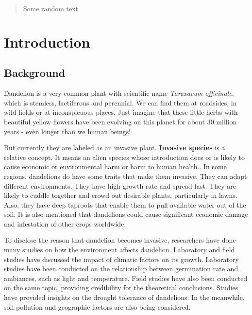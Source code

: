 \documentclass[12pt]{article}
\title{}  %
\begin{document}
\begin{abstract}

	Some random text
	
\end{abstract}

\maketitle
\tableofcontents

\section{Introduction}

	\subsection{Background}
	
	Dandelion is a very common plant with scientific name \textit{Taraxacum officinale}, which is stemless, lactiferous and perennial\autocite{stewart2002biology}.  We can find them at roadsides, in wild fields or at inconspicuous places.  Just imagine that these little herbs with beautiful yellow flowers have been evolving on this planet for about 30 million years\autocite{dandelionhistory} - even longer than we human beings!
	
	But currently they are labeled as an invasive plant.  \textbf{Invasive species} is a relative concept.  It means an alien species whose introduction does or is likely to cause economic or environmental harm or harm to human health.\autocite{defInvasive}.  In some regions, dandelions do have some traits that make them invasive.  They can adapt different environments.  They have high growth rate and spread fast. They are likely to cuddle together and crowd out desirable plants, particularly in lawns.  Also, they have deep taproots that enable them to pull available water out of the soil.  It is also mentioned that dandelions could cause significant economic damage and infestation of other crops worldwide\autocite{stewart2002biology}.
	
	To disclose the reason that dandelion becomes invasive, researchers have done many studies on how the environment affects dandelion.  Laboratory and field studies have discussed the impact of climatic factors on its growth. Laboratory studies have been conducted on the relationship between germination rate and ambiances, such as light and temperature\autocite{letchamo1996light}.  Field studies have also been conducted on the same topic, providing credibility for the theoretical conclusions\autocite{yoneda1991effects}.  Studies have provided insights on the drought tolerance of dandelions\autocite{brock2005drought}. In the meanwhile, soil pollution and geographic factors are also being considered\autocite{verhoeven2013geographic}.
	
\end{document}
